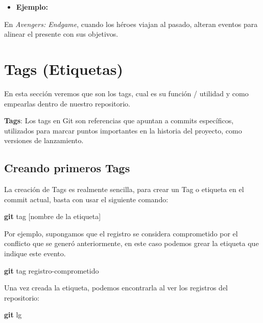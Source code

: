\documentclass[
]{book}
\newenvironment{Shaded}{\begin{snugshade}}{\end{snugshade}}
\newcommand{\FunctionTok}[1]{\textcolor[rgb]{0.13,0.29,0.53}{\textbf{#1}}}
\newcommand{\NormalTok}[1]{#1}
\providecommand{\tightlist}{%
  \setlength{\itemsep}{0pt}\setlength{\parskip}{0pt}}
\begin{document}
\begin{itemize}
\tightlist
\item
  \textbf{Ejemplo:}
\end{itemize}

En \emph{Avengers: Endgame}, cuando los héroes viajan al pasado, alteran eventos para alinear el presente con sus objetivos.

\chapter{Tags (Etiquetas)}\label{tags-etiquetas}

En esta sección veremos que son los tags, cual es su función / utilidad y como empearlas dentro de nuestro repositorio.

\textbf{Tags}: Los tags en Git son referencias que apuntan a commits específicos, utilizados para marcar puntos importantes en la historia del proyecto, como versiones de lanzamiento.

\section{Creando primeros Tags}\label{creando-primeros-tags}

La creación de Tags es realmente sencilla, para crear un Tag o etiqueta en el commit actual, basta con usar el siguiente comando:

\begin{Shaded}
\begin{Highlighting}[]
\FunctionTok{git}\NormalTok{ tag [nombre de la etiqueta]}
\end{Highlighting}
\end{Shaded}

Por ejemplo, supongamos que el registro se considera comprometido por el conflicto que se generó anteriormente, en este caso podemos grear la etiqueta que indique este evento.

\begin{Shaded}
\begin{Highlighting}[]
\FunctionTok{git}\NormalTok{ tag registro{-}comprometido}
\end{Highlighting}
\end{Shaded}

Una vez creada la etiqueta, podemos encontrarla al ver los registros del repositorio:

\begin{Shaded}
\begin{Highlighting}[]
\FunctionTok{git}\NormalTok{ lg}
\end{Highlighting}
\end{Shaded}
\end{document}
